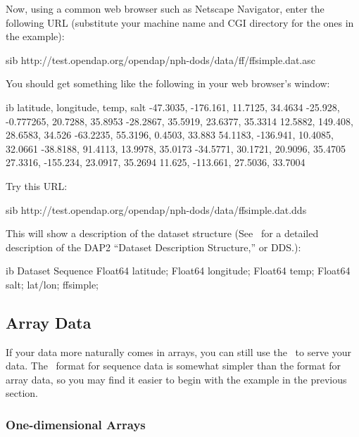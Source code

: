 Now, using a common web browser such as Netscape Navigator, enter the
following URL (substitute your machine name and CGI directory for the
ones in the example):

\begin{vcode}{sib}
http://test.opendap.org/opendap/nph-dods/data/ff/ffsimple.dat.asc
\end{vcode}

You should get something like the following in your web browser's
window:

\begin{vcode}{ib}
latitude, longitude, temp, salt
-47.3035, -176.161, 11.7125, 34.4634
-25.928, -0.777265, 20.7288, 35.8953
-28.2867, 35.5919, 23.6377, 35.3314
12.5882, 149.408, 28.6583, 34.526
-63.2235, 55.3196, 0.4503, 33.883
54.1183, -136.941, 10.4085, 32.0661
-38.8188, 91.4113, 13.9978, 35.0173
-34.5771, 30.1721, 20.9096, 35.4705
27.3316, -155.234, 23.0917, 35.2694
11.625, -113.661, 27.5036, 33.7004
\end{vcode}

Try this URL:

\begin{vcode}{sib}
http://test.opendap.org/opendap/nph-dods/data/ffsimple.dat.dds
\end{vcode}

This will show a description of the dataset structure (See \DODSuser\ 
for a detailed description of the DAP2 ``Dataset Description
Structure,'' or DDS.):

\begin{vcode}{ib}
Dataset {
    Sequence {
        Float64 latitude;
        Float64 longitude;
        Float64 temp;
        Float64 salt;
    } lat/lon;
} ffsimple;
\end{vcode}

\subsection{Array Data}

If your data more naturally comes in arrays, you can still use the
\ffs\ to serve your data.  The \ffnd\ format for sequence data is
somewhat simpler than the format for array data, so you may find it
easier to begin with the example in the previous section.


\subsubsection{One-dimensional Arrays}

